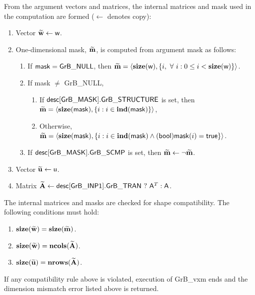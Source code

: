 From the argument vectors and matrices, the internal matrices and mask used in 
the computation are formed ($\leftarrow$ denotes copy):
\begin{enumerate}
	\item Vector ${\bf \widetilde{w}} \leftarrow {\sf w}$.

	\item One-dimensional mask, ${\bf \widetilde{m}}$, is computed from 
    argument {\sf mask} as follows:
	\begin{enumerate}
		\item If ${\sf mask} = {\sf GrB\_NULL}$, then ${\bf \widetilde{m}} = 
        \langle \bold{size}({\sf w}), \{i, \ \forall \ i : 0 \leq i < 
        \bold{size}({\sf w}) \} \rangle$.

		\item If {\sf mask} $\ne$ {\sf GrB\_NULL},  
        \begin{enumerate}
            \item If ${\sf desc[GrB\_MASK].GrB\_STRUCTURE}$ is set, then
            ${\bf \widetilde{m}} = 
            \langle \bold{size}({\sf mask}), \{i : i \in \bold{ind}({\sf mask}) \} \rangle$,
            \item Otherwise, ${\bf \widetilde{m}} = 
            \langle \bold{size}({\sf mask}), \{i : i \in \bold{ind}({\sf mask}) \wedge
            ({\sf bool}){\sf mask}(i) = {\sf true} \} \rangle$.
        \end{enumerate}

		\item	If ${\sf desc[GrB\_MASK].GrB\_SCMP}$ is set, then 
        ${\bf \widetilde{m}} \leftarrow \neg {\bf \widetilde{m}}$.
	\end{enumerate}

	\item Vector ${\bf \widetilde{u}} \leftarrow {\sf u}$.

	\item Matrix ${\bf \widetilde{A}} \leftarrow {\sf desc[GrB\_INP1].GrB\_TRAN} \ ? \ {\sf A}^T : {\sf A}$.
\end{enumerate}

The internal matrices and masks are checked for shape compatibility. The following 
conditions must hold:
\begin{enumerate}
	\item $\bold{size}({\bf \widetilde{w}}) = \bold{size}({\bf \widetilde{m}})$.

	\item $\bold{size}({\bf \widetilde{w}}) = \bold{ncols}({\bf \widetilde{A}})$.

	\item $\bold{size}({\bf \widetilde{u}}) = \bold{nrows}({\bf \widetilde{A}})$.
\end{enumerate}
If any compatibility rule above is violated, execution of {\sf GrB\_vxm} ends and 
the dimension mismatch error listed above is returned.


